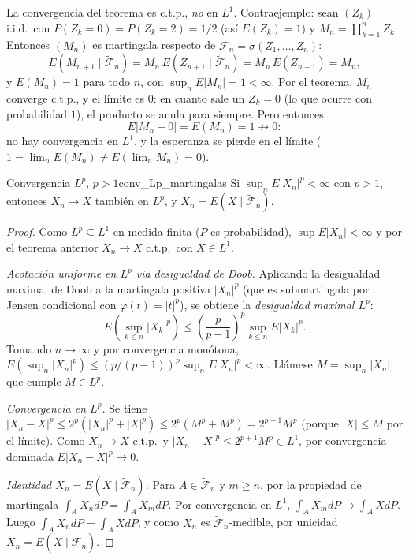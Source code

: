 \documentclass[11pt, a4paper]{article}
\begin{document}
\obs La convergencia del teorema es c.t.p., \emph{no} en $L^1$. Contraejemplo: sean $(Z_k)$
i.i.d.\ con $P(Z_k = 0) = P(Z_k = 2) = 1/2$ (así $E(Z_k) = 1$) y $M_n = \prod_{k=1}^n Z_k$.
Entonces $(M_n)$ es martingala respecto de $\widetilde{\mathcal{F}}_n = \sigma(Z_1, \dots,
Z_n)$:
$$ E(M_{n+1} \mid \widetilde{\mathcal{F}}_n) = M_n \, E(Z_{n+1} \mid
\widetilde{\mathcal{F}}_n) = M_n \, E(Z_{n+1}) = M_n, $$
y $E(M_n) = 1$ para todo $n$, con $\sup_n E|M_n| = 1 < \infty$. Por el teorema, $M_n$ converge
c.t.p., y el límite es $0$: en cuanto sale un $Z_k = 0$ (lo que ocurre con probabilidad $1$),
el producto se anula para siempre. Pero entonces
$$ E|M_n - 0| = E(M_n) = 1 \not\to 0: $$
no hay convergencia en $L^1$, y la esperanza se pierde en el límite
($1 = \lim_n E(M_n) \ne E(\lim_n M_n) = 0$).

\begin{teorema}{Convergencia $L^p$, $p > 1$}{conv_Lp_martingalas}
Si $\sup_n E|X_n|^p < \infty$ con $p > 1$, entonces $X_n \to X$ también en $L^p$, y
$X_n = E(X \mid \widetilde{\mathcal{F}}_n)$.
\end{teorema}

\begin{proof}
Como $L^p \subseteq L^1$ en medida finita ($P$ es probabilidad), $\sup E|X_n| < \infty$ y por el
teorema anterior $X_n \to X$ c.t.p.\ con $X \in L^1$.

\textit{Acotación uniforme en $L^p$ via desigualdad de Doob.} Aplicando la desigualdad maximal de
Doob a la martingala positiva $|X_n|^p$ (que es submartingala por Jensen condicional con
$\varphi(t) = |t|^p$), se obtiene la \emph{desigualdad maximal $L^p$}:
$$ E\!\left(\sup_{k \le n} |X_k|^p\right) \le \left(\frac{p}{p - 1}\right)^p \sup_{k \le n}
E|X_k|^p. $$
Tomando $n \to \infty$ y por convergencia monótona, $E(\sup_n |X_n|^p) \le (p/(p-1))^p \sup_n
E|X_n|^p < \infty$. Llámese $M = \sup_n |X_n|$, que cumple $M \in L^p$.

\textit{Convergencia en $L^p$.} Se tiene $|X_n - X|^p \le 2^p (|X_n|^p + |X|^p) \le 2^p (M^p + M^p)
= 2^{p+1} M^p$ (porque $|X| \le M$ por el límite). Como $X_n \to X$ c.t.p.\ y $|X_n - X|^p \le
2^{p+1} M^p \in L^1$, por convergencia dominada $E|X_n - X|^p \to 0$.

\textit{Identidad $X_n = E(X \mid \widetilde{\mathcal{F}}_n)$.} Para $A \in
\widetilde{\mathcal{F}}_n$ y $m \ge n$, por la propiedad de martingala $\int_A X_n dP = \int_A X_m
dP$. Por convergencia en $L^1$, $\int_A X_m dP \to \int_A X dP$. Luego $\int_A X_n dP = \int_A X
dP$, y como $X_n$ es $\widetilde{\mathcal{F}}_n$-medible, por unicidad $X_n = E(X \mid
\widetilde{\mathcal{F}}_n)$.
\end{proof}
\end{document}
